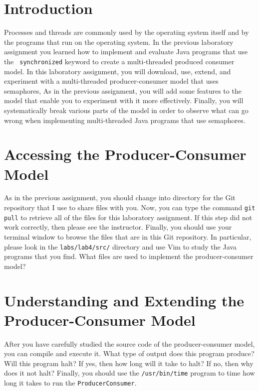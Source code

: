 


\usepackage[compact]{titlesec}


\section*{Introduction}

Processes and threads are commonly used by the operating system itself and by the programs that run on the operating
system. In the previous laboratory assignment you learned how to implement and evaluate Java programs that use the {\tt
  synchronized} keyword to create a multi-threaded produced consumer model. In this laboratory assignment, you will
download, use, extend, and experiment with a multi-threaded producer-consumer model that uses semaphores,  As in the
previous assignment, you will add some features to the model that enable you to experiment with it more effectively.
Finally, you will systematically break various parts of the model in order to observe what can go wrong when
implementing multi-threaded Java programs that use semaphores.

\section*{Accessing the Producer-Consumer Model}

As in the previous assignment, you should change into directory for the Git repository that I use to share files with
you. Now, you can type the command {\tt git pull} to retrieve all of the files for this laboratory assignment. If this
step did not work correctly, then please see the instructor.  Finally, you should use your terminal window to browse
the files that are in this Git repository.  In particular, please look in the {\tt labs/lab4/src/} directory and use Vim
to study the Java programs that you find. What files are used to implement the producer-consumer model?

\section*{Understanding and Extending the Producer-Consumer Model}

After you have carefully studied the source code of the producer-consumer model, you can compile and execute it.  What
type of output does this program produce?  Will this program halt?  If yes, then how long will it take to halt?  If no,
then why does it not halt?  Finally, you should use the {\tt /usr/bin/time} program to time how long it takes to run the
{\tt ProducerConsumer}.

